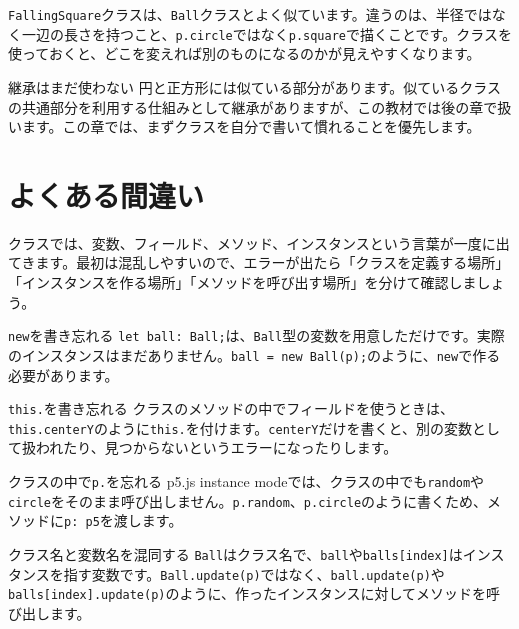 \texttt{FallingSquare}クラスは、\texttt{Ball}クラスとよく似ています。違うのは、半径ではなく一辺の長さを持つこと、\texttt{p.circle}ではなく\texttt{p.square}で描くことです。クラスを使っておくと、どこを変えれば別のものになるのかが見えやすくなります。

\begin{notebox}{継承はまだ使わない}
円と正方形には似ている部分があります。似ているクラスの共通部分を利用する仕組みとして継承がありますが、この教材では後の章で扱います。この章では、まずクラスを自分で書いて慣れることを優先します。
\end{notebox}

\section{よくある間違い}

クラスでは、変数、フィールド、メソッド、インスタンスという言葉が一度に出てきます。最初は混乱しやすいので、エラーが出たら「クラスを定義する場所」「インスタンスを作る場所」「メソッドを呼び出す場所」を分けて確認しましょう。

\begin{mistakebox}{\texttt{new}を書き忘れる}
\texttt{let ball: Ball;}は、\texttt{Ball}型の変数を用意しただけです。実際のインスタンスはまだありません。\texttt{ball = new Ball(p);}のように、\texttt{new}で作る必要があります。
\end{mistakebox}

\begin{mistakebox}{\texttt{this.}を書き忘れる}
クラスのメソッドの中でフィールドを使うときは、\texttt{this.centerY}のように\texttt{this.}を付けます。\texttt{centerY}だけを書くと、別の変数として扱われたり、見つからないというエラーになったりします。
\end{mistakebox}

\begin{mistakebox}{クラスの中で\texttt{p.}を忘れる}
p5.js instance modeでは、クラスの中でも\texttt{random}や\texttt{circle}をそのまま呼び出しません。\texttt{p.random}、\texttt{p.circle}のように書くため、メソッドに\texttt{p: p5}を渡します。
\end{mistakebox}

\begin{mistakebox}{クラス名と変数名を混同する}
\texttt{Ball}はクラス名で、\texttt{ball}や\texttt{balls[index]}はインスタンスを指す変数です。\texttt{Ball.update(p)}ではなく、\texttt{ball.update(p)}や\texttt{balls[index].update(p)}のように、作ったインスタンスに対してメソッドを呼び出します。
\end{mistakebox}

